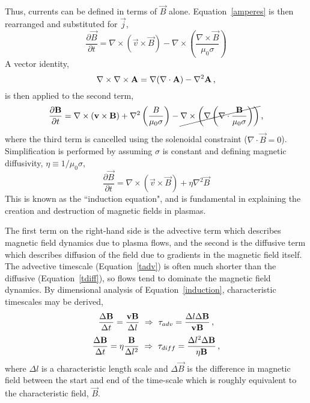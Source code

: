 Thus, currents can be defined in terms of $\vec{B}$ alone.
Equation~\ref{amperes} is then rearranged and substituted for $\vec{j}$,
\begin{equation}\label{eqn:indprevecid}
\frac{\partial \vec{B}}{\partial t} = \nabla \times (\vec{v}\times\vec{B}) - \nabla \times \left( \frac{\nabla\times\vec{B}}{\mu_0 \sigma} \right)  
\end{equation}
A vector identity,
\begin{equation}\label{eqn:vecid11}
\nabla\times\nabla\times\vec{A}=\nabla(\nabla\cdot \vec{A})-\nabla^2\vec{A} \mbox{\,,}
\end{equation}
is then applied to the second term,
\begin{equation}
\frac{\partial \vec{B}}{\partial t} = \nabla \times (\vec{v}\times\vec{B}) + \nabla^2 \left( \frac{B}{\mu_0 \sigma} \right) - \cancel{ \nabla\times\left(\nabla\left( \nabla \cdot \frac{\vec{B}}{\mu_0 \sigma} \right)\right) } \mbox{\,,}
\end{equation}
where the third term is cancelled using the solenoidal constraint ($\nabla \cdot \vec{B}=0$). Simplification is performed by assuming $\sigma$ is constant and defining magnetic diffusivity, $\eta\equiv1/\mu_0 \sigma$,
\begin{equation}\label{induction}
\frac{\partial \vec{B}}{\partial t} = \nabla \times (\vec{v} \times \vec{B}) + \eta \nabla^2 \vec{B}  
\end{equation}
This is known as the ``induction equation", and is fundamental in explaining the creation and destruction of magnetic fields in plasmas.

The first term on the right-hand side is the advective term which describes magnetic field dynamics due to plasma flows, and the second is the diffusive term which describes diffusion of the field due to gradients in the magnetic field itself. The advective timescale (Equation~\ref{tadv}) is often much shorter than the diffusive (Equation~\ref{tdiff}), so flows tend to dominate the magnetic field dynamics. By dimensional analysis of Equation~\ref{induction}, characteristic timescales may be derived,
\begin{equation}\label{tadv}
\frac{\Delta \vec{B}}{\Delta t} = \frac{\vec{v}  \vec{B}}{\Delta l} ~\Rightarrow~
\tau_{adv} = \frac{\Delta l \Delta \vec{B}}{\vec{v}  \vec{B}} \mbox{\,,}
\end{equation}
\begin{equation}\label{tdiff}
\frac{\Delta \vec{B}}{\Delta t} = \eta \frac{\vec{B}}{\Delta l^2} ~\Rightarrow~
\tau_{diff}= \frac{\Delta l^2 \Delta \vec{B}}{\eta \vec{B}} \mbox{\,,}
\end{equation}
where $\Delta l$ is a characteristic length scale and $\Delta \vec{B}$ is the difference in magnetic field between the start and end of the time-scale which is roughly equivalent to the characteristic field, $\vec{B}$. 

